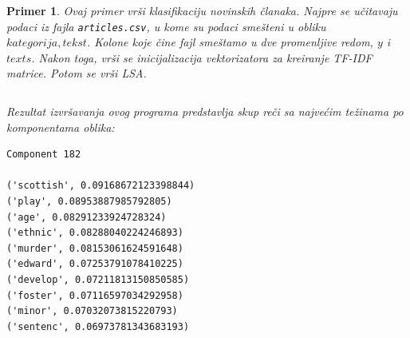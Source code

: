 \documentclass[a4paper]{article}
\newtheorem{primer}{Primer}[section]
\begin{document}
\begin{primer}
Ovaj primer vrši klasifikaciju novinskih članaka. Najpre se učitavaju podaci iz fajla \texttt{articles.csv}, u kome su podaci smešteni u obliku $kategorija, tekst$. Kolone koje čine fajl smeštamo u dve promenljive redom, $y$ i $texts$. Nakon toga, vrši se inicijalizacija vektorizatora za kreiranje TF-IDF matrice. Potom se vrši LSA.

\inputminted{python}{Codes/2/0-lsa.py}
Rezultat izvršavanja ovog programa predstavlja skup reči sa najvećim težinama po komponentama oblika:
\begin{lstlisting}
Component 182

('scottish', 0.09168672123398844)
('play', 0.08953887985792805)
('age', 0.08291233924728324)
('ethnic', 0.08288040224246893)
('murder', 0.08153061624591648)
('edward', 0.07253791078410225)
('develop', 0.07211813150850585)
('foster', 0.07116597034292958)
('minor', 0.07032073815220793)
('sentenc', 0.06973781343683193)
\end{lstlisting}
\end{primer}
\end{document}
